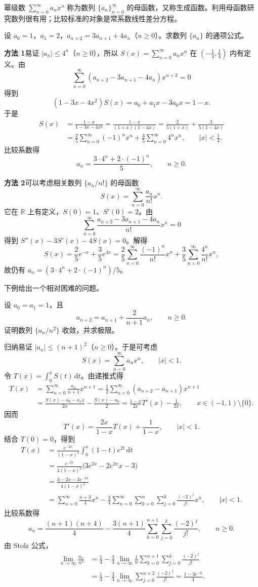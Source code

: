 幂级数 $\sum_{n=0}^{\infty}a_nx^n$ 称为数列 $\{a_n\}_{n=0}^{\infty}$ 的母函数，又称生成函数。利用母函数研究数列很有用；比较标准的对象是常系数线性差分方程。

设 $a_0=1$，$a_1=2$，$a_{n+2}=3a_{n+1}+4a_n$（$n\geq0$）。求数列 $\{a_n\}$ 的通项公式。

\sol \textbf{方法 1}\quad 易证 $|a_n|\leq4^n$（$n\geq0$），所以 $S(x)=\sum_{n=0}^{\infty}a_nx^n$ 在 $(-\tfrac14,\tfrac14)$ 内有定义。由
\[
\sum_{n=0}^{\infty}(a_{n+2}-3a_{n+1}-4a_n)x^{n+2}=0
\]
得到
\[
(1-3x-4x^2)S(x)=a_0+a_1x-3a_0x=1-x.
\]
于是
\begin{align*}
S(x)&=\frac{1-x}{1-3x-4x^2}
=\frac{1-x}{(1+x)(1-4x)}
=\frac2{5(1+x)}+\frac3{5(1-4x)}\\
&=\frac25\sum_{n=0}^{\infty}(-1)^nx^n
+\frac35\sum_{n=0}^{\infty}4^nx^n,
\qquad |x|<\frac14.
\end{align*}
比较系数得
\[
a_n=\frac{3\cdot4^n+2\cdot(-1)^n}{5},\qquad n\geq0.
\]

\noindent\textbf{方法 2}\quad 可以考虑相关数列 $\{a_n/n!\}$ 的母函数
\[
S(x)=\sum_{n=0}^{\infty}\frac{a_n}{n!}x^n.
\]
它在 $\mathbb R$ 上有定义，$S(0)=1$、$S'(0)=2$。由
\[
\sum_{n=0}^{\infty}\frac{a_{n+2}-3a_{n+1}-4a_n}{n!}x^n=0
\]
得到 $S''(x)-3S'(x)-4S(x)=0$。解得
\[
S(x)=\frac25e^{-x}+\frac35e^{4x}
=\frac25\sum_{n=0}^{\infty}\frac{(-1)^n}{n!}x^n
+\frac35\sum_{n=0}^{\infty}\frac{4^n}{n!}x^n,
\]
故仍有 $a_n=(3\cdot4^n+2\cdot(-1)^n)/5$。

下例给出一个相对困难的问题。

设 $a_0=a_1=1$，且
\[
a_{n+2}=a_{n+1}+\frac{2}{n+1}a_n,\qquad n\geq0.
\]
证明数列 $\{a_n/n^2\}$ 收敛，并求极限。

\sol 归纳易证 $|a_n|\leq(n+1)^2$（$n\geq0$）。于是可考虑
\[
S(x)=\sum_{n=0}^{\infty}a_nx^n,\qquad |x|<1.
\]
令 $T(x)=\int_0^xS(t)\,\mathrm dt$。由递推式得
\begin{align*}
T(x)&=\sum_{n=0}^{\infty}\frac{a_n}{n+1}x^{n+1}
=\frac12\sum_{n=0}^{\infty}(a_{n+2}-a_{n+1})x^{n+1}\\
&=\frac{S(x)-a_0-a_1x}{2x}-\frac{S(x)-a_0}{2}
=\frac{1-x}{2x}T'(x)-\frac1{2x},\qquad x\in(-1,1)\setminus\{0\}.
\end{align*}
因而
\[
T'(x)=\frac{2x}{1-x}T(x)+\frac1{1-x},\qquad |x|<1.
\]
结合 $T(0)=0$，得到
\begin{align*}
T(x)
&=\frac{e^{-2x}}{(1-x)^2}\int_0^x(1-t)e^{2t}\,\mathrm dt\\
&=\frac{e^{-2x}}{4(1-x)^2}\bigl(3e^{2x}-2e^{2x}x-3\bigr)\\
&=\frac{3-2x-3e^{-2x}}{4(1-x)^2}\\
&=\sum_{n=0}^{\infty}\frac{n+3}{4}x^n
-\frac34\sum_{n=0}^{\infty}\sum_{k=0}^{n}\sum_{j=0}^{k}
\frac{(-2)^j}{j!}x^n,\qquad |x|<1.
\end{align*}
比较系数得
\[
a_n=\frac{(n+1)(n+4)}4
-\frac{3(n+1)}4\sum_{k=0}^{n+1}\sum_{j=0}^{k}\frac{(-2)^j}{j!},
\qquad n\geq0.
\]
由 Stolz 公式，
\begin{align*}
\lim_{n\to\infty}\frac{a_n}{n^2}
&=\frac14-\frac34\lim_{n\to\infty}\frac1n
\sum_{k=0}^{n+1}\sum_{j=0}^{k}\frac{(-2)^j}{j!}\\
&=\frac14-\frac34\lim_{n\to\infty}
\sum_{j=0}^{n+2}\frac{(-2)^j}{j!}
=\frac{1-3e^{-2}}4.
\end{align*}

